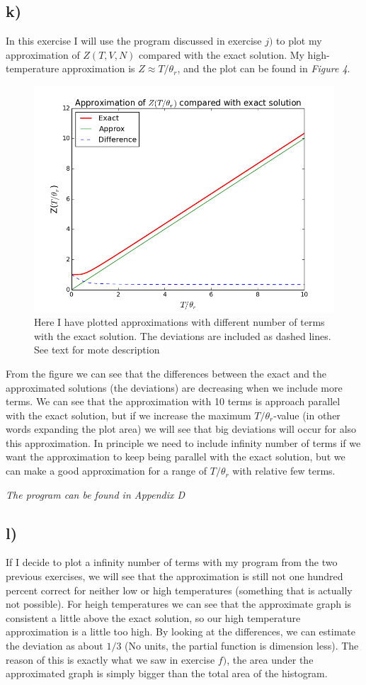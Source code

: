 \documentclass{scrartcl}
\begin{document}
\subsection*{k)}
In this exercise I will use the program discussed in exercise $j)$ to plot my approximation of $Z(T,V,N)$ compared with the exact solution. My high-temperature approximation is $Z\approx T/\theta_r$, and the plot can be found in \textit{Figure 4}.
\begin{figure}[!htbp]
\centering
\includegraphics[width=120mm]{oblig2_4.png}
\caption{Here I have plotted approximations with different number of terms with the exact solution. The deviations are included as dashed lines. See text for mote description \label{overflow}}
\end{figure}
From the figure we can see that the differences between the exact and the approximated solutions (the deviations) are decreasing when we include more terms. We can see that the approximation with 10 terms is approach parallel with the exact solution, but if we increase the maximum $T/\theta_r$-value (in other words expanding the plot area) we will see that big deviations will occur for also this approximation. In principle we need to include infinity number of terms if we want the approximation to keep being parallel with the exact solution, but we can make a good approximation for a range of $T/\theta_r$ with relative few terms.\par\vspace{3mm}
\textit{The program can be found in Appendix D}

\subsection*{l)}
If I decide to plot a infinity number of terms with my program from the two previous exercises, we will see that the approximation is still not one hundred percent correct for neither low or high temperatures (something that is actually not possible). For heigh temperatures we can see that the approximate graph is consistent a little above the exact solution, so our high temperature approximation is a little too high. By looking at the differences, we can estimate the deviation as about $1/3$ (No units, the partial function is dimension less). The reason of this is exactly what we saw in exercise $f)$, the area under the approximated graph is simply bigger than the total area of the histogram. 
\end{document}
